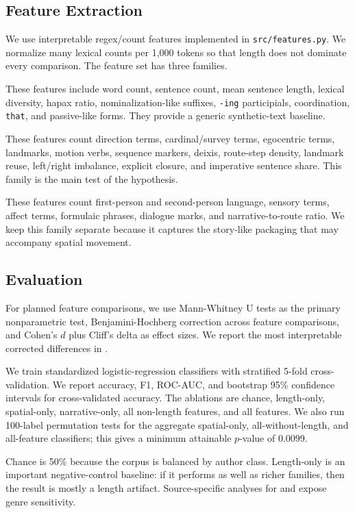 \subsection{Feature Extraction}
\label{sec:features}

We use interpretable regex/count features implemented in \texttt{src/features.py}. We normalize many lexical counts per 1,000 tokens so that length does not dominate every comparison. The feature set has three families.

These features include word count, sentence count, mean sentence length, lexical diversity, hapax ratio, nominalization-like suffixes, \texttt{-ing} participials, coordination, \texttt{that}, and passive-like forms. They provide a generic synthetic-text baseline.

These features count direction terms, cardinal/survey terms, egocentric terms, landmarks, motion verbs, sequence markers, deixis, route-step density, landmark reuse, left/right imbalance, explicit closure, and imperative sentence share. This family is the main test of the \spatialgrammar hypothesis.

These features count first-person and second-person language, sensory terms, affect terms, formulaic phrases, dialogue marks, and narrative-to-route ratio. We keep this family separate because it captures the story-like packaging that may accompany spatial movement.

\subsection{Evaluation}
\label{sec:evaluation}

For planned feature comparisons, we use Mann-Whitney U tests as the primary nonparametric test, Benjamini-Hochberg correction across feature comparisons, and Cohen's $d$ plus Cliff's delta as effect sizes. We report the most interpretable corrected differences in .

We train standardized logistic-regression classifiers with stratified 5-fold cross-validation. We report accuracy, F1, ROC-AUC, and bootstrap 95\% confidence intervals for cross-validated accuracy. The ablations are chance, length-only, spatial-only, narrative-only, all non-length features, and all features. We also run 100-label permutation tests for the aggregate spatial-only, all-without-length, and all-feature classifiers; this gives a minimum attainable $p$-value of 0.0099.

Chance is 50\% because the corpus is balanced by author class. Length-only is an important negative-control baseline: if it performs as well as richer families, then the result is mostly a length artifact. Source-specific analyses for \rtr and \writingprompts expose genre sensitivity.

